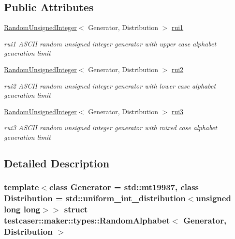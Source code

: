 \subsection*{Public Attributes}
\begin{DoxyCompactItemize}
\item 
\mbox{\hyperlink{classtestcaser_1_1maker_1_1types_1_1RandomUnsignedInteger}{Random\+Unsigned\+Integer}}$<$ Generator, Distribution $>$ \mbox{\hyperlink{structtestcaser_1_1maker_1_1types_1_1RandomAlphabet_a76c4f8fd0fc57c51e2f3c4c1ff64e8b3}{rui1}}
\begin{DoxyCompactList}\small\item\em rui1 A\+S\+C\+II random unsigned integer generator with upper case alphabet generation limit \end{DoxyCompactList}\item 
\mbox{\hyperlink{classtestcaser_1_1maker_1_1types_1_1RandomUnsignedInteger}{Random\+Unsigned\+Integer}}$<$ Generator, Distribution $>$ \mbox{\hyperlink{structtestcaser_1_1maker_1_1types_1_1RandomAlphabet_aa59de4bce4077e7075f5cac015233643}{rui2}}
\begin{DoxyCompactList}\small\item\em rui2 A\+S\+C\+II random unsigned integer generator with lower case alphabet generation limit \end{DoxyCompactList}\item 
\mbox{\hyperlink{classtestcaser_1_1maker_1_1types_1_1RandomUnsignedInteger}{Random\+Unsigned\+Integer}}$<$ Generator, Distribution $>$ \mbox{\hyperlink{structtestcaser_1_1maker_1_1types_1_1RandomAlphabet_a4840472bf48a5fb87c61d27d96fe47e1}{rui3}}
\begin{DoxyCompactList}\small\item\em rui3 A\+S\+C\+II random unsigned integer generator with mixed case alphabet generation limit \end{DoxyCompactList}\end{DoxyCompactItemize}


\subsection{Detailed Description}
\subsubsection*{template$<$class Generator = std\+::mt19937, class Distribution = std\+::uniform\+\_\+int\+\_\+distribution$<$unsigned long long$>$$>$\newline
struct testcaser\+::maker\+::types\+::\+Random\+Alphabet$<$ Generator, Distribution $>$}

